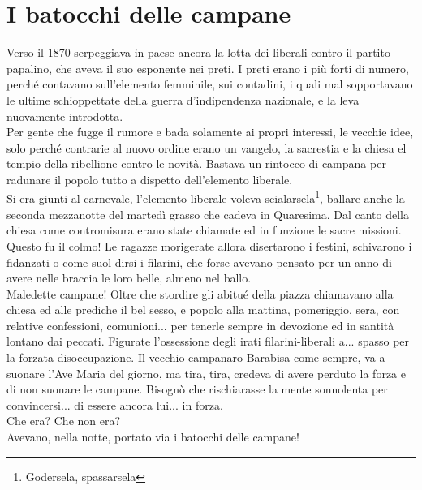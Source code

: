 
\chapter{I batocchi delle campane}
Verso il 1870 serpeggiava in paese ancora la lotta dei liberali contro il partito papalino, che aveva il suo esponente nei preti. I preti erano i più forti di numero, perché contavano sull'elemento femminile, sui contadini, i quali mal sopportavano le ultime schioppettate della guerra d'indipendenza nazionale, e la leva nuovamente introdotta.\\
\indent Per gente che fugge il rumore e bada solamente ai propri interessi, le vecchie idee, solo perché contrarie al nuovo ordine erano un vangelo, la sacrestia e la chiesa el tempio della ribellione contro le novità. Bastava un rintocco di campana per radunare il popolo tutto a dispetto dell'elemento liberale. \\
\indent Si era giunti al carnevale, l'elemento liberale voleva scialarsela\footnote{Godersela, spassarsela}, ballare anche la seconda mezzanotte del martedì grasso che cadeva in Quaresima. Dal canto della chiesa come contromisura erano state chiamate ed in funzione le sacre missioni.\\
\indent Questo fu il colmo! Le ragazze morigerate allora disertarono i festini, schivarono i fidanzati o come suol dirsi i filarini, che forse avevano pensato per un anno di avere nelle braccia le loro belle, almeno nel ballo.\\
\indent Maledette campane! Oltre che stordire gli abitué della piazza chiamavano alla chiesa ed alle prediche il bel sesso, e popolo alla mattina, pomeriggio, sera, con relative confessioni, comunioni... per tenerle sempre in devozione ed in santità lontano dai peccati. Figurate l'ossessione degli irati filarini-liberali a... spasso per la forzata disoccupazione.
Il vecchio campanaro Barabisa come sempre, va a suonare l'Ave Maria del giorno, ma tira, tira, credeva di avere perduto la forza e di non suonare le campane. Bisognò che rischiarasse la mente sonnolenta per convincersi... di essere ancora lui... in forza.\\
\indent Che era? Che non era?\\
\indent Avevano, nella notte, portato via i batocchi delle campane!\\
